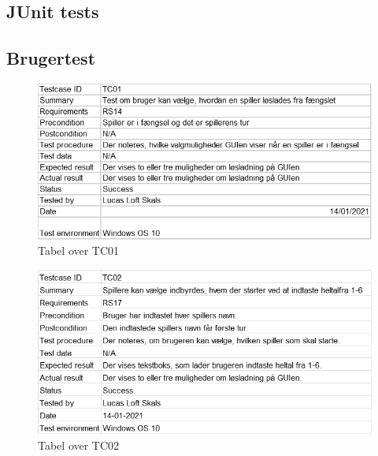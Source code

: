 \begin{flushleft}
\doublespacing

\subsection{JUnit tests}
\subsection{Brugertest}

\begin{figure}[htp] %
    \centering
    \includegraphics[width=14cm]{Report/figures/Usertests/TC01.png}
    \caption{Tabel over TC01}
    \label{Testcase01}
\end{figure}

\begin{figure}[htp] %
    \centering
    \includegraphics[width=14cm]{Report/figures/Usertests/TC02.png}
    \caption{Tabel over TC02}
    \label{Testcase02}
\end{figure}


\end{flushleft}
